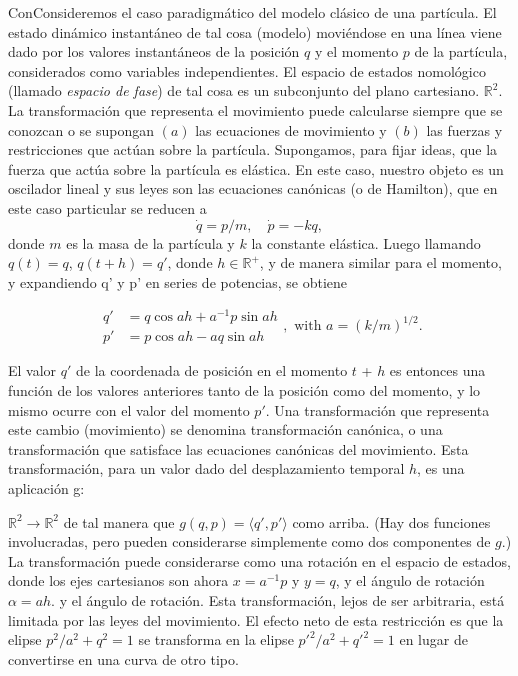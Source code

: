 \begin{justifying}
    ConConsideremos el caso paradigmático del modelo clásico de una partícula. El   estado dinámico instantáneo de tal cosa (modelo) moviéndose en una línea viene  dado por los valores instantáneos de la posición $q$ y el momento $p$ de la    partícula, considerados como variables independientes. El espacio de estados nomológico (llamado \emph{espacio de fase}) de tal cosa es un subconjunto del plano cartesiano. $\mathbb{R}^2$. La transformación que representa el movimiento puede calcularse siempre que se conozcan o se supongan $(a)$ las ecuaciones de movimiento y $(b)$ las fuerzas y restricciones que actúan sobre la partícula. Supongamos, para fijar ideas, que la fuerza que actúa sobre la partícula es elástica. En este caso, nuestro objeto es un oscilador lineal y sus leyes son las ecuaciones canónicas (o de Hamilton), que en este caso particular se reducen a
    \[
    \dot{q} = p/m, \quad \dot{p} = -kq,
    \]
    donde $m$ es la masa de la partícula y $k$ la constante elástica. Luego    llamando $q(t)=q$, $q(t+h)=q'$, donde $h \in \mathbb{R}^+$, y de manera similar para el momento, y expandiendo q' y p' en series de potencias, se obtiene

    \[
    \begin{aligned}
    q' &= q \cos ah + a^{-1}p \sin ah \\
    p' &= p \cos ah - aq \sin ah
    \end{aligned}
    , \text{ with } a = (k/m)^{1/2}.
    \]

    El valor $q'$ de la coordenada de posición en el momento $t$ + $h$ es entonces una función de los valores anteriores tanto de la posición como del momento, y
    lo mismo ocurre con el valor del momento $p'$. Una transformación que representa este cambio (movimiento) se denomina transformación canónica, o una transformación
    que satisface las ecuaciones canónicas del movimiento. Esta transformación,
    para un valor dado del desplazamiento temporal $h$, es una aplicación g:
    
    $\mathbb{R}^2 \to \mathbb{R}^2$ de tal manera que $g(q, p) = \langle q', p' \rangle$ como arriba. (Hay dos funciones involucradas, pero pueden considerarse simplemente como dos componentes de $g$.) La transformación puede considerarse como una rotación en el espacio de estados, donde los ejes cartesianos son ahora $x = a^{-1}p$ y $y=q$, y el ángulo de rotación $\alpha = ah$. y el ángulo de rotación. Esta transformación, lejos de ser arbitraria, está limitada por las leyes del movimiento. El efecto neto de esta restricción es que la elipse $p^2/a^2 + q^2 = 1$ se transforma en la elipse $p'^2/a^2 + q'^2 = 1$ en lugar de convertirse en una curva de otro tipo.


\end{justifying}
